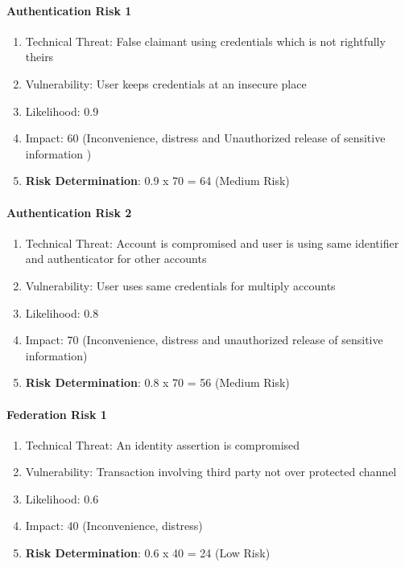 \paragraph{Authentication Risk 1}
\begin{enumerate}
	\item Technical Threat: False claimant using credentials which is not rightfully theirs
	\item Vulnerability: User keeps credentials at an insecure place
	\item Likelihood: 0.9
	\item Impact: 60 (Inconvenience, distress and Unauthorized release of sensitive information )
	\item \textbf{Risk Determination}: 0.9 x 70 = 64 (Medium Risk) 
\end{enumerate}

\paragraph{Authentication Risk 2}
\begin{enumerate}
	\item Technical Threat: Account is compromised and user is using same identifier and authenticator for other accounts
	\item Vulnerability: User uses same credentials for multiply accounts
	\item Likelihood: 0.8
	\item Impact: 70 (Inconvenience, distress and unauthorized release of sensitive information)
	\item \textbf{Risk Determination}: 0.8 x 70 = 56 (Medium Risk)
\end{enumerate}

\paragraph{Federation Risk 1 }
\begin{enumerate}
	\item Technical Threat: An identity assertion is compromised
	\item Vulnerability: Transaction involving third party not over protected channel
	\item Likelihood: 0.6
	\item Impact: 40 (Inconvenience, distress)
	\item \textbf{Risk Determination}: 0.6 x 40 = 24 (Low Risk)
\end{enumerate}

